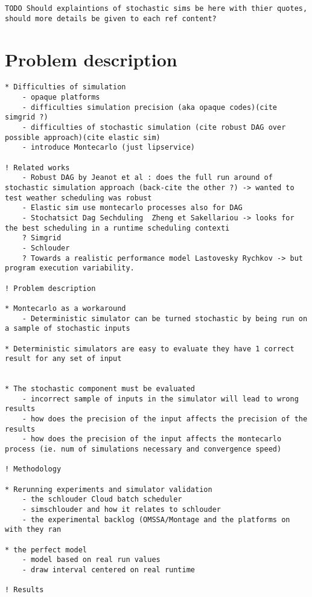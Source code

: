 \documentclass[10pt,conference,compsocconf]{IEEEtran}
\begin{document}
\texttt{TODO Should explaintions of stochastic sims be here with thier quotes, should
more details be given to each ref content?}

\section{Problem description}




\newpage
\begin{verbatim}
* Difficulties of simulation
	- opaque platforms
	- difficulties simulation precision (aka opaque codes)(cite simgrid ?)
	- difficulties of stochastic simulation (cite robust DAG over possible approach)(cite elastic sim)
	- introduce Montecarlo (just lipservice)

! Related works
	- Robust DAG by Jeanot et al : does the full run around of stochastic simulation approach (back-cite the other ?) -> wanted to test weather scheduling was robust
	- Elastic sim use montecarlo processes also for DAG	
	- Stochatsict Dag Sechduling  Zheng et Sakellariou -> looks for the best scheduling in a runtime scheduling contexti
	? Simgrid
	- Schlouder
	? Towards a realistic performance model Lastovesky Rychkov -> but program execution variability.

! Problem description
	
* Montecarlo as a workaround 
	- Deterministic simulator can be turned stochastic by being run on a sample of stochastic inputs

* Deterministic simulators are easy to evaluate they have 1 correct result for any set of input 


* The stochastic component must be evaluated
	- incorrect sample of inputs in the simulator will lead to wrong results
	- how does the precision of the input affects the precision of the results
	- how does the precision of the input affects the montecarlo process (ie. num of simulations necessary and convergence speed)

! Methodology 

* Rerunning experiments and simulator validation
	- the schlouder Cloud batch scheduler
	- simschlouder and how it relates to schlouder
	- the experimental backlog (OMSSA/Montage and the platforms on with they ran

* the perfect model
	- model based on real run values
	- draw interval centered on real runtime

! Results
\end{verbatim}
\end{document}
